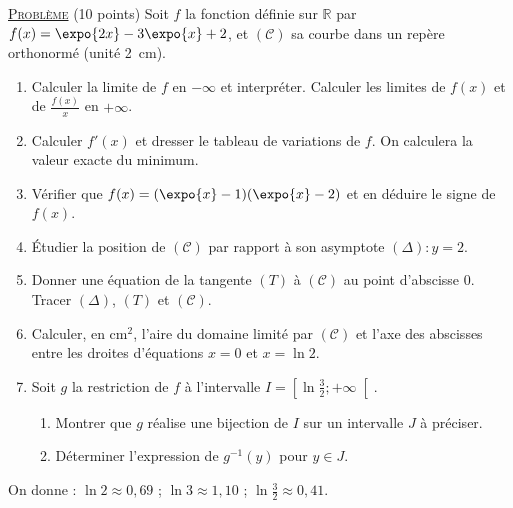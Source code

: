 \noindent \underline{\textsc{Probl\`eme}} (10 points) \newline
Soit $f$ la fonction d\'efinie sur $\mathbb{R}$ par $f(x) = \expo{2x} - 3\expo{x} + 2$, et $(\mathscr{C})$ sa courbe
dans un rep\`ere orthonorm\'e (unit\'e 2~cm).
\begin{enumerate}
      \item Calculer la limite de $f$ en $-\infty$ et interpr\'eter. Calculer les limites de $f(x)$ et de $\frac{f(x)}{x}$ en $+\infty$.
      \item Calculer $f'(x)$ et dresser le tableau de variations de $f$. On calculera la valeur exacte du minimum.
      \item V\'erifier que $f(x) = (\expo{x} - 1)(\expo{x} - 2)$ et en d\'eduire le signe de $f(x)$.
      \item \'Etudier la position de $(\mathscr{C})$ par rapport \`a son asymptote $(\Delta) : y = 2$.
      \item Donner une \'equation de la tangente $(T)$ \`a $(\mathscr{C})$ au point d'abscisse $0$. Tracer $(\Delta)$, $(T)$ et $(\mathscr{C})$.
      \item Calculer, en cm$^2$, l'aire du domaine limit\'e par $(\mathscr{C})$ et l'axe des abscisses entre les droites
            d'\'equations $x = 0$ et $x = \ln 2$.
      \item Soit $g$ la restriction de $f$ \`a l'intervalle $I = \left[\ln\frac{3}{2} ; +\infty\right[$.
            \begin{enumerate}
            \item Montrer que $g$ r\'ealise une bijection de $I$ sur un intervalle $J$ \`a pr\'eciser.
            \item D\'eterminer l'expression de $g^{-1}(y)$ pour $y \in J$.
            \end{enumerate}
\end{enumerate}
\begin{center}
On donne : $\ln 2 \approx 0{,}69$ ; $\ln 3 \approx 1{,}10$ ; $\ln\frac{3}{2} \approx 0{,}41$.
\end{center}

